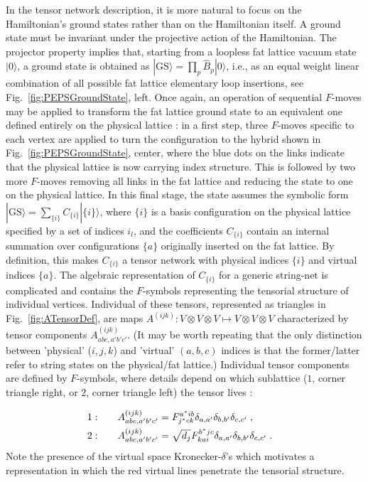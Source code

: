\documentclass[twocolumn,floats,prx,showpacs]{revtex4-1}
\begin{document}
In the tensor network description, it is more natural to focus on the Hamiltonian's ground states rather than on the Hamiltonian itself. A ground state must be invariant under the projective action of the Hamiltonian. The projector property implies that, starting from a loopless fat lattice vacuum 
state $|0\rangle$, a ground state is obtained as $|\mathrm{GS}\rangle =\prod_p \hat B_p |0\rangle$, i.e., as an equal weight linear combination of all possible fat lattice elementary loop insertions, see Fig.~\ref{fig:PEPSGroundState}, left. Once again, an operation of sequential $F$-moves may be applied to transform the fat lattice ground state to an equivalent one defined entirely on the physical lattice \cite{Buerschaper2009,Gu2009}: in a first step, three $F$-moves specific to each vertex are applied to turn the configuration to the hybrid shown in Fig.~\ref{fig:PEPSGroundState}, center, where the blue dots on the links indicate that the physical lattice is now carrying index structure. This is followed by two more $F$-moves removing all links in the fat lattice and reducing the state to one on the physical lattice. In this final stage, the state assumes the symbolic form $|\mathrm{GS}\rangle=\sum_{\{i\}} C_{\{i\}}|\{i\}\rangle$, where $\{i\}$ is a basis configuration on the physical lattice specified by a set of indices $i_l$, and the coefficients $C_{\{i\}}$ contain an internal summation over configurations $\{a\}$ originally inserted on the fat lattice. By definition, this makes $C_{\{i\}}$ a tensor network with physical indices $\{i\}$ and virtual indices $\{a\}$. The algebraic representation of $C_{\{i\}}$ for a generic string-net is complicated and contains the  $F$-symbols representing the tensorial structure of individual vertices. Individual of these tensors, represented as triangles in Fig.~\ref{fig:ATensorDef}, are maps $A^{(ijk)}:V\otimes V\otimes V \mapsto V\otimes V\otimes V$ characterized by tensor components $A^{(ijk)}_{abc,a'b'c'}$. (It may be worth repeating that the only distinction between 'physical' ($i,j,k$) and 'virtual' $(a,b,c)$ indices is that the former/latter refer to string states on the physical/fat lattice.) Individual tensor components are defined by $F$-symbols, where  details depend on which sublattice ($1$, corner triangle right, or $2$, corner triangle left) the tensor lives \cite{Buerschaper2009,Gu2009}:

\begin{align*}
1:&\qquad A^{(ijk)}_{abc,a'b'c'}=F^{a^\ast ib}_{j^\ast c k}\delta_{a,a'}
\delta_{b,b'}\delta_{c,c'}\;,\cr
2:&\qquad A^{(ijk)}_{abc,a'b'c'}=\sqrt{d_j}F^{b^\ast jc}_{kai}\delta_{a,a'}\delta_{b,b'}\delta_{c,c'}\;.
\end{align*}
Note the presence of the virtual space Kronecker-$\delta$'s which motivates a representation in which the red virtual lines penetrate the tensorial structure. 
\end{document}
